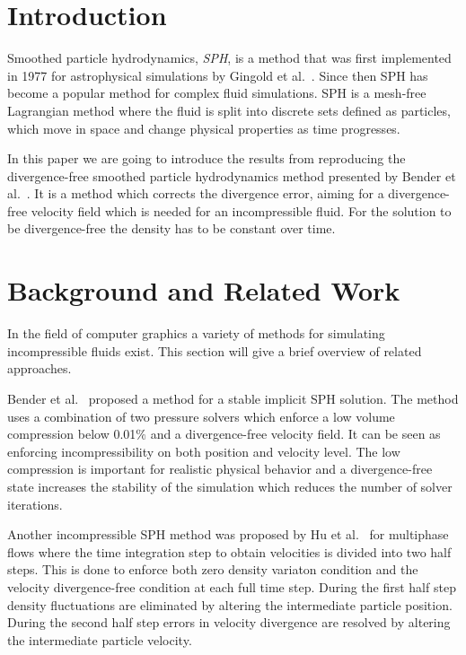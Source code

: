 \section{Introduction}
    Smoothed particle hydrodynamics, \textit{SPH}, is a method that was first implemented in 1977 for astrophysical simulations by Gingold et al.~\cite{firstSPH}.
    Since then SPH has become a popular method for complex fluid simulations.
    SPH is a mesh-free Lagrangian method where the fluid is split into discrete sets defined as particles, which move in space and change physical properties as time progresses.
    
    In this paper we are going to introduce the results from reproducing the divergence-free smoothed particle hydrodynamics method presented by Bender et al.~\cite{bender}.
    It is a method which corrects the divergence error, aiming for a divergence-free velocity field which is needed for an incompressible fluid.
    For the solution to be divergence-free the density has to be constant over time.
    

\section{Background and Related Work}

    In the field of computer graphics a variety of methods for simulating incompressible fluids exist.
    This section will give a brief overview of related approaches.

    Bender et al.~\cite{bender} proposed a method for a stable implicit SPH solution.
    The method uses a combination of two pressure solvers which enforce a low volume compression below 0.01$\%$ and a divergence-free velocity field.
    It can be seen as enforcing incompressibility on both position and velocity level.
    The low compression is important for realistic physical behavior and a divergence-free state increases the stability of the simulation which reduces the number of solver iterations.

    Another incompressible SPH method was proposed by Hu et al.~\cite{hu} for multiphase flows where the time integration step to obtain velocities is divided into two half steps.
    This is done to enforce both zero density variaton condition and the velocity divergence-free condition at each full time step.
    During the first half step density fluctuations are eliminated by altering the intermediate particle position.
    During the second half step errors in velocity divergence are resolved by altering the intermediate particle velocity.

